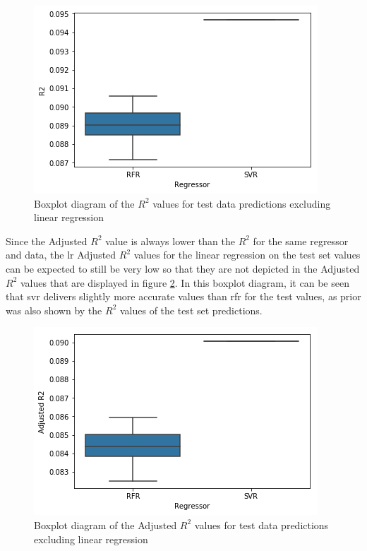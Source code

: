 \documentclass[a4paper, 11pt, oneside]{Thesis}  %
\begin{document}
\begin{figure}[h]
\includegraphics[scale=0.7]{Figures/Regressor_comparison/boxplot_r2_test_data_without_lr.png}
\centering
\caption{Boxplot diagram of the $R^2$ values for test data predictions excluding linear regression}
\label{fig:boxplot_r2_test_data_without_lr}
\end{figure}

Since the Adjusted $R^2$ value is always lower than the $R^2$ for the same regressor and data, the \ac{lr} Adjusted $R^2$ values for the linear regression on the test set values can be expected to still be very low so that they are not depicted in the Adjusted $R^2$ values that are displayed in figure \ref{fig:boxplot_adj_r2_test_data_without_lr}. In this boxplot diagram, it can be seen that \ac{svr} delivers slightly more accurate values than \ac{rfr} for the test values, as prior was also shown by the $R^2$ values of the test set predictions.

\begin{figure}[h]
\includegraphics[scale=0.7]{Figures/Regressor_comparison/boxplot_adj_r2_test_data_without_lr.png}
\centering
\caption{Boxplot diagram of the Adjusted $R^2$ values for test data predictions excluding linear regression}
\label{fig:boxplot_adj_r2_test_data_without_lr}
\end{figure}
\end{document}
